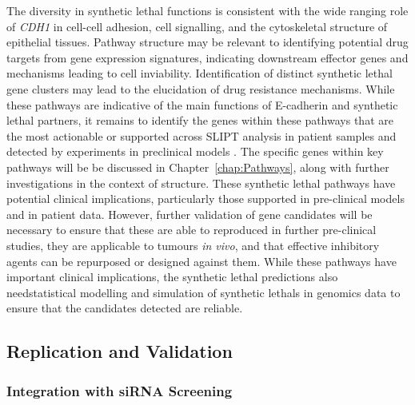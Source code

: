 The diversity in \gls{synthetic lethal} functions is consistent with the wide ranging role of \textit{CDH1} in cell-cell adhesion, cell signalling, and the cytoskeletal structure of epithelial tissues. Pathway structure may be relevant to identifying potential drug targets from \gls{gene expression} signatures, indicating downstream effector genes and mechanisms leading to cell inviability. Identification of distinct \gls{synthetic lethal} gene clusters may lead to the elucidation of drug resistance mechanisms. While these \glspl{pathway} are indicative of the main functions of \gls{E-cadherin} and \gls{synthetic lethal} partners, it remains to identify the genes within these \glspl{pathway} that are the most actionable or supported across \gls{SLIPT} analysis in patient samples and detected by experiments in preclinical models \citep{Chen2014, Telford2015}.  The specific genes within key \glspl{pathway} will be be discussed in Chapter~\ref{chap:Pathways}, along with further investigations in the context of  structure. These \gls{synthetic lethal} \glspl{pathway} have potential clinical implications, particularly those supported in pre-clinical models and in patient  data. However, further validation of gene candidates will be necessary to ensure that these are able to reproduced in further pre-clinical studies, they are applicable to tumours \textit{in vivo}, and that effective inhibitory agents can be repurposed or designed against them. While these \glspl{pathway} have important clinical implications, the \gls{synthetic lethal} predictions also needstatistical modelling and simulation of \glspl{synthetic lethal} in \glspl{genomic}  data to ensure that the candidates detected are reliable.


\subsection{Replication and Validation}

\subsubsection{Integration with siRNA Screening}


